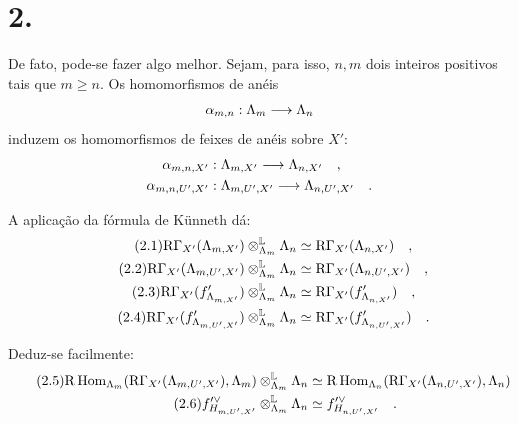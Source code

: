 \section*{2.}
De fato, pode-se fazer algo melhor. Sejam, para isso, $n,m$ dois inteiros positivos tais que $m \geq n$. Os homomorfismos de anéis
\[
\alpha_{m,n} : \Lambda_m \longrightarrow \Lambda_n
\]
induzem os homomorfismos de feixes de anéis sobre $X'$:
\begin{align*}
\alpha_{m,n,X'} &: \Lambda_{m,X'} \longrightarrow \Lambda_{n,X'} \quad , \\
\alpha_{m,n,U',X'} &: \Lambda_{m,U',X'} \longrightarrow \Lambda_{n,U',X'} \quad .
\end{align*}

A aplicação da fórmula de Künneth dá:
\begin{align}
\tag{2.1} \mathrm{R}\Gamma_{X'}(\Lambda_{m,X'}) \otimes_{\Lambda_m}^{\mathbb{L}} \Lambda_n &\simeq \mathrm{R}\Gamma_{X'}(\Lambda_{n,X'}) \quad , \\
\tag{2.2} \mathrm{R}\Gamma_{X'}(\Lambda_{m,U',X'}) \otimes_{\Lambda_m}^{\mathbb{L}} \Lambda_n &\simeq \mathrm{R}\Gamma_{X'}(\Lambda_{n,U',X'}) \quad , \\
\tag{2.3} \mathrm{R}\Gamma_{X'}(f'_{\Lambda_{m,X'}}) \otimes_{\Lambda_m}^{\mathbb{L}} \Lambda_n &\simeq \mathrm{R}\Gamma_{X'}(f'_{\Lambda_{n,X'}}) \quad , \\
\tag{2.4} \mathrm{R}\Gamma_{X'}(f'_{\Lambda_{m,U',X'}}) \otimes_{\Lambda_m}^{\mathbb{L}} \Lambda_n &\simeq \mathrm{R}\Gamma_{X'}(f'_{\Lambda_{n,U',X'}}) \quad .
\end{align}

Deduz-se facilmente:
\begin{align}
\tag{2.5} \mathrm{R}\operatorname{Hom}_{\Lambda_m}(\mathrm{R}\Gamma_{X'}(\Lambda_{m,U',X'}), \Lambda_m) \otimes_{\Lambda_m}^{\mathbb{L}} \Lambda_n &\simeq \mathrm{R}\operatorname{Hom}_{\Lambda_n}(\mathrm{R}\Gamma_{X'}(\Lambda_{n,U',X'}), \Lambda_n) \\
\tag{2.6} f'^\vee_{H_{m,U',X'}} \otimes_{\Lambda_m}^{\mathbb{L}} \Lambda_n &\simeq f'^\vee_{H_{n,U',X'}} \quad .
\end{align}

